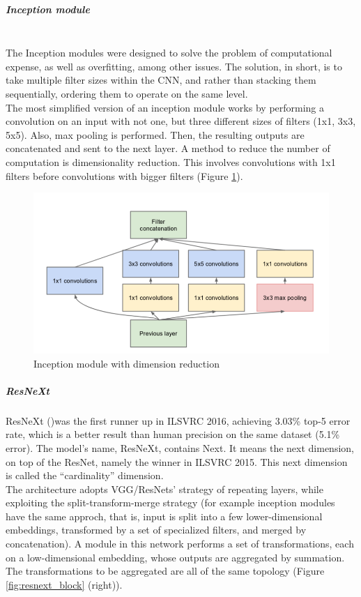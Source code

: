 \documentclass{article}
\begin{document}
\subparagraph{Inception module}\mbox{}\\
The Inception modules were designed to solve the problem of computational expense, as well as overfitting, among other issues. The solution, in short, is to take multiple filter sizes within the CNN, and rather than stacking them sequentially, ordering them to operate on the same level. \\
 The most simplified version of an inception module works by performing a convolution on an input with not one, but three different sizes of filters (1x1, 3x3, 5x5). Also, max pooling is performed. Then, the resulting outputs are concatenated and sent to the next layer.
A method to reduce the number of computation is dimensionality reduction. This involves convolutions with 1x1 filters before convolutions with bigger filters (Figure \ref{fig:incmodule}).
\newpage
\begin{figure}[h]
	\centering
	\includegraphics[width=0.5\linewidth]{image/inc_module}
	\caption{Inception module with dimension reduction}
	\label{fig:incmodule}
\end{figure}




\subparagraph{ResNeXt}
ResNeXt (\cite{resneXt})was the first runner up in ILSVRC 2016, achieving 3.03\% top-5 error rate, which is a better result than human precision on the same dataset (5.1\% error). The model's name, ResNeXt, contains Next. It means the next dimension, on top of the ResNet, namely the winner in ILSVRC 2015. This next dimension is called the “cardinality” dimension.\\
The architecture adopts VGG/ResNets' strategy of repeating layers, while
exploiting the split-transform-merge strategy (for example inception modules have the same approch, that is, input is split into a few lower-dimensional embeddings, transformed by a set of specialized filters, and merged by concatenation). 
A module in this network performs a set of transformations, each on a low-dimensional embedding, whose outputs are aggregated by summation. The transformations to be aggregated are all of the same topology (Figure \ref{fig:resnext_block} (right)).\\
\end{document}
